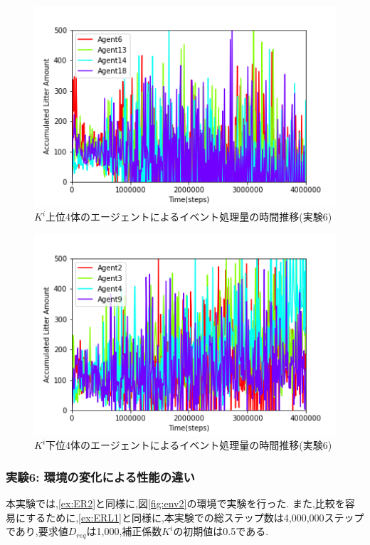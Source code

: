 \documentclass[12pt,a4j,twoside]{jarticle}
\begin{document}
  \begin{figure}
    \centering
    \includegraphics[width=150mm]{figures/al_graph_ERL_Complex_top.png}
    \caption{$K^i$上位4体のエージェントによるイベント処理量の時間推移(実験6)}
    \label{fig:al_ERL_Complex_top}
  \end{figure}

  \begin{figure}
    \centering
    \includegraphics[width=150mm]{figures/al_graph_ERL_Complex_worst.png}
    \caption{$K^i$下位4体のエージェントによるイベント処理量の時間推移(実験6)}
    \label{fig:al_ERL_Complex_worst}
  \end{figure}

  \subsubsection{実験6: 環境の変化による性能の違い}
  \label{ex:ERL2}  
  本実験では,\ref{ex:ER2}と同様に,図\ref{fig:env2}の環境で実験を行った.
  また,比較を容易にするために,\ref{ex:ERL1}と同様に,本実験での総ステップ数は4,000,000ステップであり,要求値$D_{req}$は1,000,補正係数$K^i$の初期値は0.5である.
\end{document}
